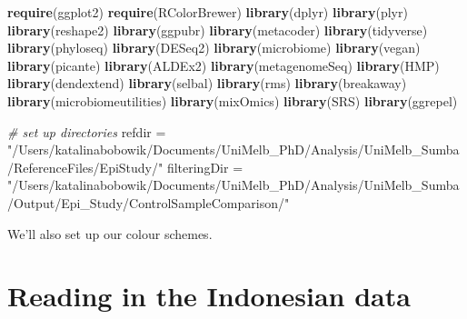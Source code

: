 \documentclass[]{article}
\newenvironment{Shaded}{\begin{snugshade}}{\end{snugshade}}
\newcommand{\CommentTok}[1]{\textcolor[rgb]{0.56,0.35,0.01}{\textit{#1}}}
\newcommand{\KeywordTok}[1]{\textcolor[rgb]{0.13,0.29,0.53}{\textbf{#1}}}
\newcommand{\NormalTok}[1]{#1}
\newcommand{\StringTok}[1]{\textcolor[rgb]{0.31,0.60,0.02}{#1}}
\begin{document}
\begin{Shaded}
\begin{Highlighting}[]
\KeywordTok{require}\NormalTok{(ggplot2)}
\KeywordTok{require}\NormalTok{(RColorBrewer)}
\KeywordTok{library}\NormalTok{(dplyr)}
\KeywordTok{library}\NormalTok{(plyr)}
\KeywordTok{library}\NormalTok{(reshape2)}
\KeywordTok{library}\NormalTok{(ggpubr)}
\KeywordTok{library}\NormalTok{(metacoder)}
\KeywordTok{library}\NormalTok{(tidyverse)             }
\KeywordTok{library}\NormalTok{(phyloseq)                   }
\KeywordTok{library}\NormalTok{(DESeq2)                       }
\KeywordTok{library}\NormalTok{(microbiome)               }
\KeywordTok{library}\NormalTok{(vegan)                         }
\KeywordTok{library}\NormalTok{(picante)                     }
\KeywordTok{library}\NormalTok{(ALDEx2)                      }
\KeywordTok{library}\NormalTok{(metagenomeSeq)          }
\KeywordTok{library}\NormalTok{(HMP)                             }
\KeywordTok{library}\NormalTok{(dendextend)               }
\KeywordTok{library}\NormalTok{(selbal)                       }
\KeywordTok{library}\NormalTok{(rms)}
\KeywordTok{library}\NormalTok{(breakaway)        }
\KeywordTok{library}\NormalTok{(microbiomeutilities)}
\KeywordTok{library}\NormalTok{(mixOmics)}
\KeywordTok{library}\NormalTok{(SRS)}
\KeywordTok{library}\NormalTok{(ggrepel)}

\CommentTok{# set up directories}
\NormalTok{refdir =}\StringTok{ "/Users/katalinabobowik/Documents/UniMelb_PhD/Analysis/UniMelb_Sumba/ReferenceFiles/EpiStudy/"}
\NormalTok{filteringDir =}\StringTok{ "/Users/katalinabobowik/Documents/UniMelb_PhD/Analysis/UniMelb_Sumba/Output/Epi_Study/ControlSampleComparison/"}
\end{Highlighting}
\end{Shaded}

We'll also set up our colour schemes.

\begin{Shaded}
\end{Shaded}

\hypertarget{reading-in-the-indonesian-data}{%
\section{Reading in the Indonesian
data}\label{reading-in-the-indonesian-data}}
\end{document}
